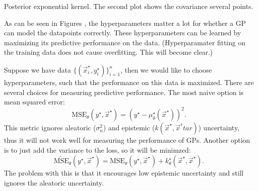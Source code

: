 \begin{marginfigure}[.5cm]
  \vfill
  \label{fig:gp-posterior-exponential}
  \caption{Posterior exponential kernel. The second plot shows the covariance \wrt several
  points.}
\end{marginfigure}

As can be seen in Figures , the
hyperparameters matter a lot for whether a GP can model the datapoints
correctly. These hyperparameters can be learned by maximizing its predictive
performance on the data. (Hyperparamater fitting on the training data does not
cause overfitting.  This will become clear.)

Suppose we have data $\{(\vec{x}_i^\star,y_i^\star)\}_{i=1}^n$, then we would
like to choose hyperparameters, such that the performance on this data is
maximized. There are several choices for measuring predictive performance.
The most naive option is mean squared error: \[
  \text{MSE}_{\theta}(y^\star,\vec{x}^\star) = (y^\star - \mu_{\theta}^\star(\vec{x}^\star))^2
.\]
This metric ignores aleatoric ($\sigma_n^2$) and epistemic
($k(\vec{x}^\star,\vec{x}^star)$) uncertainty, thus it will not work well for
measuring the performance of GPs. Another option is to just add the variance
to the loss, so it will be minimzed: \[
  \tilde{\text{MSE}}_{\theta}(y^\star,\vec{x}^\star) = \text{MSE}_{\theta}(y^\star,\vec{x}^\star) + k_{\theta}^\star(\vec{x}^\star,\vec{x}^\star)
.\]
The problem with this is that it encourages low epistemic uncertainty and
still ignores the aleatoric uncertainty.

